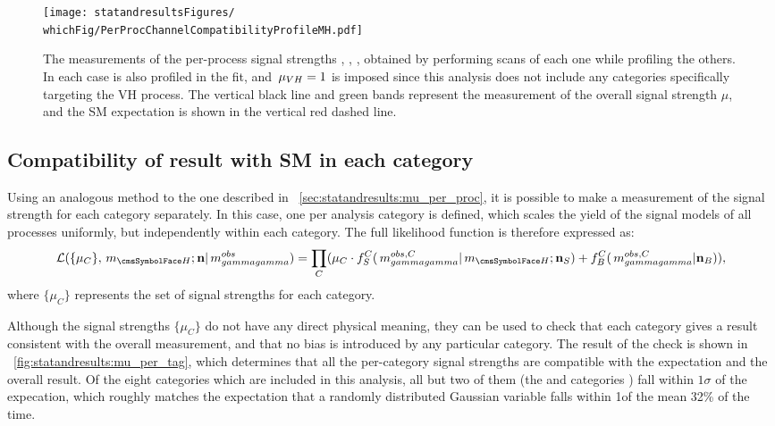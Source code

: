 \begin{figure}[ht!]
\centering
\texttt{[image: statandresultsFigures/\\whichFig/PerProcChannelCompatibilityProfileMH.pdf]} 
\caption{The measurements of the per-process signal strengths \muggH, \muVBF, \muttH, obtained by performing \DNLL scans of each one while profiling the others. In each case \mH is also profiled in the fit, and $\,\mu_{VH}=1$ is imposed since this analysis does not include any categories specifically targeting the VH process. The vertical black line and green bands represent the measurement of the overall signal strength $\mu$, and the SM expectation is shown in the vertical red dashed line.}

\label{fig:statandresults:mu_per_proc}

\end{figure}

\subsection{Compatibility of result with SM in each category}

Using an analogous method to the one described in \Sec~\ref{sec:statandresults:mu_per_proc}, it is possible to make a measurement of the signal strength for each category separately. In this case, one \POI per analysis category is defined, which scales the yield of the signal models of all processes uniformly, but independently within each category. The full likelihood function is therefore expressed as:
\begin{equation}
\label{eq:statandresults:likelihood_function}
\mathcal{L}(\{\mu_C\}, \mH; \mathbf{n} | \mgg^{obs} ) = \prod_C (\mu_C \cdot f^C_S(\mgg^{obs,C} |\mH ; \mathbf{n}_S) + f^C_B(\mgg^{obs,C} | \mathbf{n}_B )), 
\end{equation}
where $\{\mu_C\}$ represents the set of signal strengths for each category.

Although the signal strengths $\{\mu_C\}$ do not have any direct physical meaning, they can be used to check that each category gives a result consistent with the overall measurement, and that no bias is introduced by any particular category. The result of the check is shown in \Fig~\ref{fig:statandresults:mu_per_tag}, which determines that all the per-category signal strengths are compatible with the \SM expectation and the overall result. Of the eight categories which are included in this analysis, all but two of them (the  and  categories ) fall within $1\sigma$ of the \SM expecation, which roughly matches the expectation that a randomly distributed Gaussian variable falls within 1\sigma of the mean 32\% of the time.

